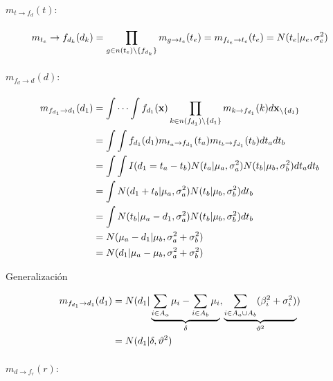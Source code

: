 \documentclass[11pt,twoside,spanish]{report} %
\begin{document}
\paragraph{$m_{t\rightarrow f_{d}}(t):$}

\begin{equation}
	\centering
	m_{t_e}\rightarrow f_{d_k}(d_k) = \prod_{g\in n(t_e)\backslash\{f_{d_k}\}} m_{g\rightarrow t_e}(t_e)
	= m_{f_{t_e}\rightarrow t_e}(t_e)
	=  N(t_e \vert  \mu_e,\sigma_e^2)
\end{equation}

\paragraph{$m_{f_{d}\rightarrow d}(d):$}

\begin{equation}
	\centering
	\begin{split}
		m_{f_{d_1}\rightarrow d_1}(d_1) & = \int\cdots\int f_{d_1}(\textbf{x})\prod_{k\in n(f_{d_1})\backslash\{d_1\}} m_{k\rightarrow f_{d_1}}(k)d\textbf{x}_{\backslash \{d_1\}} \\
		& = \int\int f_{d_1}(d_1)m_{t_a\rightarrow f_{d_1}}(t_a)m_{t_b\rightarrow f_{d_1}}(t_b)dt_adt_b\\
		& = \int\int I(d_1=t_a-t_b)N(t_a \vert \mu_a,\sigma_a^2)N(t_b \vert \mu_b,\sigma_b^2)dt_adt_b\\
		& =\int N(d_1+t_b \vert \mu_a,\sigma_a^2)N(t_b \vert \mu_b,\sigma_b^2)dt_b\\
		& =\int N(t_b \vert \mu_a-d_1,\sigma_a^2)N(t_b \vert \mu_b,\sigma_b^2)dt_b\\
		& =N( \mu_a-d_1 \vert  \mu_b,\sigma_a^2+\sigma_b^2)\\
		& =N(d_1 \vert  \mu_a-\mu_b,\sigma_a^2+\sigma_b^2)
	\end{split}
\end{equation}

Generalizaci\'on

\begin{equation}
	\centering
	\begin{split}
		m_{f_{d_1}\rightarrow d_1}(d_1)& = N(d_1 \vert  \underbrace{\sum_{i\in A_a}\mu_i-\sum_{i\in A_b}\mu_i}_{\delta},\underbrace{\sum_{i\in A_a \cup A_b}(\beta_i^2+\sigma_i^2)}_{\vartheta^2})\\
		& =  N(d_1 \vert  \delta,\vartheta^2)
	\end{split}
\end{equation}


\paragraph{$m_{d \rightarrow f_r}(r):$}
\end{document}
